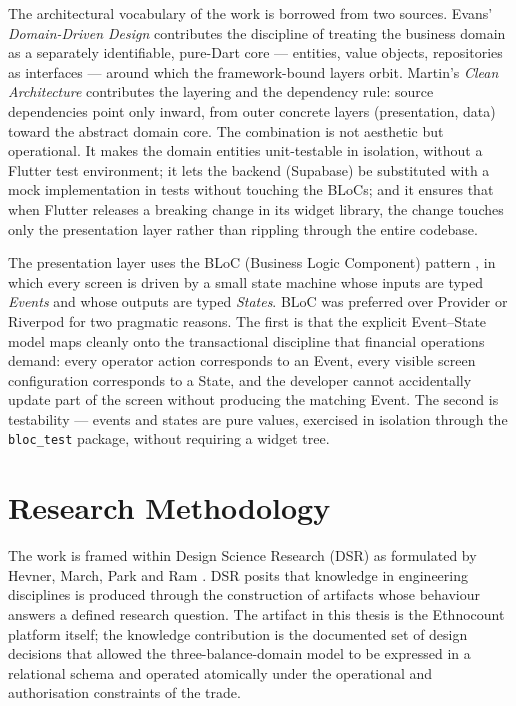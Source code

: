 The architectural vocabulary of the work is borrowed from two sources. Evans' \emph{Domain-Driven Design} \cite{evans2003} contributes the discipline of treating the business domain as a separately identifiable, pure-Dart core --- entities, value objects, repositories as interfaces --- around which the framework-bound layers orbit. Martin's \emph{Clean Architecture} \cite{martin2017} contributes the layering and the dependency rule: source dependencies point only inward, from outer concrete layers (presentation, data) toward the abstract domain core. The combination is not aesthetic but operational. It makes the domain entities unit-testable in isolation, without a Flutter test environment; it lets the backend (Supabase) be substituted with a mock implementation in tests without touching the BLoCs; and it ensures that when Flutter releases a breaking change in its widget library, the change touches only the presentation layer rather than rippling through the entire codebase.

The presentation layer uses the BLoC (Business Logic Component) pattern \cite{flutter2024bloc}, in which every screen is driven by a small state machine whose inputs are typed \emph{Events} and whose outputs are typed \emph{States}. BLoC was preferred over Provider or Riverpod for two pragmatic reasons. The first is that the explicit Event--State model maps cleanly onto the transactional discipline that financial operations demand: every operator action corresponds to an Event, every visible screen configuration corresponds to a State, and the developer cannot accidentally update part of the screen without producing the matching Event. The second is testability --- events and states are pure values, exercised in isolation through the \texttt{bloc\_test} package, without requiring a widget tree.

\section{Research Methodology}
\label{sec:dsr}

The work is framed within Design Science Research (DSR) as formulated by Hevner, March, Park and Ram \cite{hevner2004}. DSR posits that knowledge in engineering disciplines is produced through the construction of artifacts whose behaviour answers a defined research question. The artifact in this thesis is the Ethnocount platform itself; the knowledge contribution is the documented set of design decisions that allowed the three-balance-domain model to be expressed in a relational schema and operated atomically under the operational and authorisation constraints of the trade.

